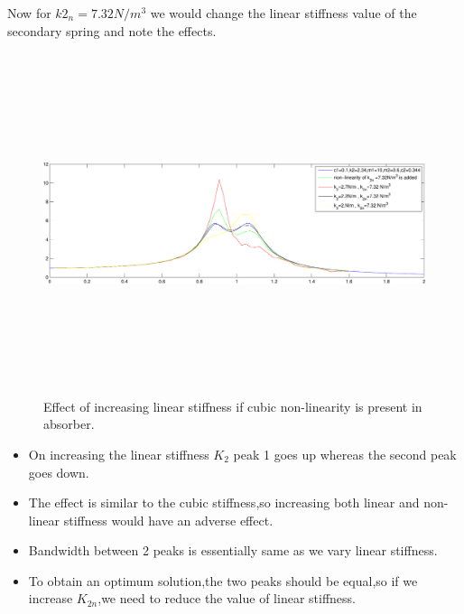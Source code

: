 Now for $k2_n=7.32 N/m^3$ we would change the linear stiffness value of the secondary spring and note the effects.
\begin{figure}[h!]
\includegraphics[width=16cm,height=10cm]{"figures/nonlinearity_secondary_2"}
  \caption{Effect of increasing linear stiffness if cubic non-linearity is present in absorber.}
  \label{fig:non-linear secondary 2}
  \end{figure}
  \begin{itemize}
  \item On increasing the linear stiffness $K_2$ peak 1 goes up whereas the second peak goes down.
  \item The effect is similar to the cubic stiffness,so increasing both linear and non-linear stiffness would have an adverse effect.
  \item Bandwidth between 2 peaks is essentially same as we vary linear stiffness.
  \item To obtain an optimum solution,the two peaks should be equal,so if we increase $K_{2n}$,we need to reduce the value of linear stiffness.
  \end{itemize}
